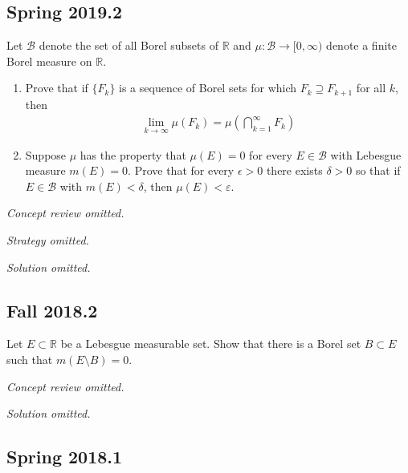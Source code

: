 \hypertarget{spring-2019.2}{%
\subsection{Spring 2019.2}\label{spring-2019.2}}

Let \(\mathcal B\) denote the set of all Borel subsets of
\({\mathbb{R}}\) and \(\mu : \mathcal B \to [0, \infty)\) denote a
finite Borel measure on \({\mathbb{R}}\).

\begin{enumerate}
\def\labelenumi{\alph{enumi}.}
\item
  Prove that if \(\{F_k\}\) is a sequence of Borel sets for which
  \(F_k \supseteq F_{k+1}\) for all \(k\), then
  \begin{align*}
  \lim _{k \rightarrow \infty} \mu\left(F_{k}\right)=\mu\left(\bigcap_{k=1}^{\infty} F_{k}\right)
  \end{align*}
\item
  Suppose \(\mu\) has the property that \(\mu (E) = 0\) for every
  \(E \in \mathcal B\) with Lebesgue measure \(m(E) = 0\). Prove that
  for every \(\epsilon > 0\) there exists \(\delta > 0\) so that if
  \(E \in \mathcal B\) with \(m(E) < δ\), then \(\mu(E) < ε\).
\end{enumerate}

\emph{Concept review omitted.}

\emph{Strategy omitted.}

\emph{Solution omitted.}

\hypertarget{fall-2018.2}{%
\subsection{Fall 2018.2}\label{fall-2018.2}}

Let \(E\subset {\mathbb{R}}\) be a Lebesgue measurable set. Show that
there is a Borel set \(B \subset E\) such that \(m(E\setminus B) = 0\).



\emph{Concept review omitted.}

\emph{Solution omitted.}

\hypertarget{spring-2018.1}{%
\subsection{Spring 2018.1}\label{spring-2018.1}}

